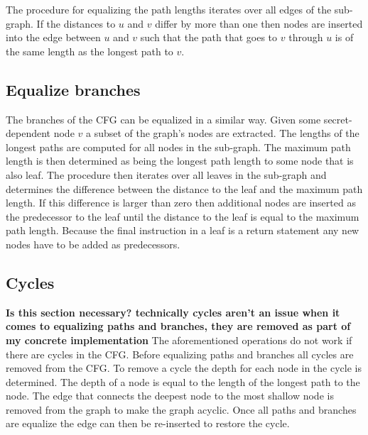 The procedure for equalizing the path lengths iterates over all edges of the sub-graph. If the distances to $u$ and $v$ differ by more than one then nodes are inserted 
into the edge between $u$ and $v$ such that the path that goes to $v$ through $u$ is of the same length as the longest path to $v$. 

\subsection{Equalize branches}
The branches of the CFG can be equalized in a similar way. Given some secret-dependent node $v$ a subset of the graph's nodes are extracted. 
The lengths of the longest paths are computed for all nodes in the sub-graph. 
The maximum path length is then determined as being the longest path length to some node that is also leaf. 
The procedure then iterates over all leaves in the sub-graph and determines the difference between the distance to the leaf and the maximum path length. 
If this difference is larger than zero then additional nodes are inserted as the predecessor to the leaf until the distance to the leaf is equal to the maximum 
path length. Because the final instruction in a leaf is a return statement any new nodes have to be added as predecessors. 

\subsection{Cycles}
\textbf{Is this section necessary? technically cycles aren't an issue when it comes to equalizing paths and branches, they are removed as part of my concrete implementation}
The aforementioned operations do not work if there are cycles in the CFG. Before equalizing paths and branches all cycles are removed from the CFG. 
To remove a cycle the depth for each node in the cycle is determined. The depth of a node is equal to the length of the longest path to the node. The edge 
that connects the deepest node to the most shallow node is removed from the graph to make the graph acyclic. Once all paths and branches are equalize the edge can then 
be re-inserted to restore the cycle. 

\begin{figure}
 \centering

 \label{fig:problemStructures}
\end{figure}

